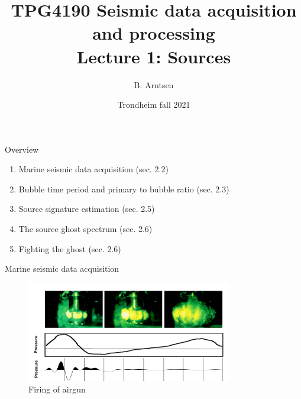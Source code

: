 \documentclass[xcolor=dvipsnames,notes]{beamer}
\begin{document}
\title{TPG4190 Seismic data acquisition and processing \\
               Lecture 1: Sources}
\author{B. Arntsen}
\date{Trondheim fall 2021}
\begin{frame}
 \titlepage
\end{frame}
\begin{frame}{Overview}
\begin{enumerate}
  \item Marine seismic data acquisition (sec. 2.2) 
  \item Bubble time period and primary to bubble ratio (sec. 2.3)
  \item Source signature estimation (sec. 2.5)
  \item The source ghost spectrum (sec. 2.6)
  \item Fighting the ghost (sec. 2.6)
\end{enumerate}
\end{frame}
\begin{frame}{Marine seismic data acquisition}
\begin{figure}
  \includegraphics[width=0.8\textwidth]{Fig/airgun1.png}
  \caption{Firing of airgun}
  \label{fig:airgun1}
\end{figure}
\end{frame}
\end{document}
